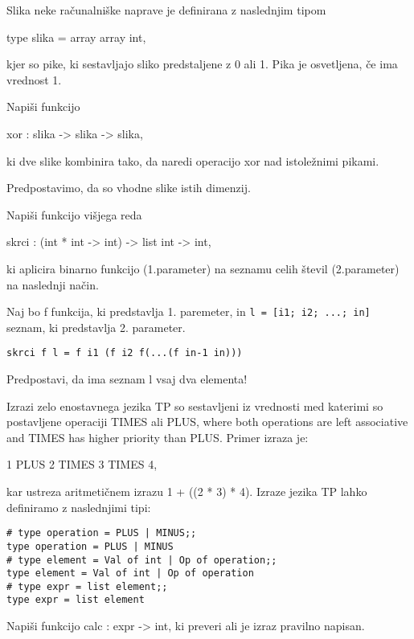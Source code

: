 \begin{ex}
  Slika neke ra\v cunalni\v ske naprave je definirana z naslednjim
  tipom

  type slika = array array int,

  kjer so pike, ki sestavljajo sliko predstaljene z 0 ali 1. Pika je
  osvetljena, \v ce ima vrednost 1.

  Napi\v si funkcijo

  xor : slika -> slika -> slika,

  ki dve slike kombinira tako, da naredi operacijo xor nad istole\v
  znimi pikami.

  Predpostavimo, da so vhodne slike istih dimenzij.


\end{ex} 
\begin{ex} 
  Napi\v si funkcijo vi\v sjega reda

  skrci : (int * int -> int) -> list int -> int,

  ki aplicira binarno funkcijo (1.parameter) na seznamu celih \v
  stevil (2.parameter) na naslednji na\v cin.

  Naj bo f funkcija, ki predstavlja 1. paremeter, in \texttt{l = [i1;
    i2; ...; in] } seznam, ki predstavlja 2. parameter.

\begin{verbatim}
skrci f l = f i1 (f i2 f(...(f in-1 in)))
\end{verbatim}

  Predpostavi, da ima seznam l vsaj dva elementa!


\end{ex}
 \begin{ex}
   Izrazi zelo enostavnega jezika TP so sestavljeni iz vrednosti med
   katerimi so postavljene operaciji TIMES ali PLUS, where both
   operations are left associative and TIMES has higher priority than
   PLUS. Primer izraza je:

   1 PLUS 2 TIMES 3 TIMES 4,

   kar ustreza aritmeti\v cnem izrazu 1 + ((2 * 3) * 4). Izraze jezika
   TP lahko definiramo z naslednjimi tipi:
 
\begin{verbatim}
# type operation = PLUS | MINUS;; 
type operation = PLUS | MINUS 
# type element = Val of int | Op of operation;; 
type element = Val of int | Op of operation
# type expr = list element;;
type expr = list element
\end{verbatim}

   Napi\v si funkcijo calc : expr -> int, ki preveri ali je izraz
   pravilno napisan.


\end{ex} 
